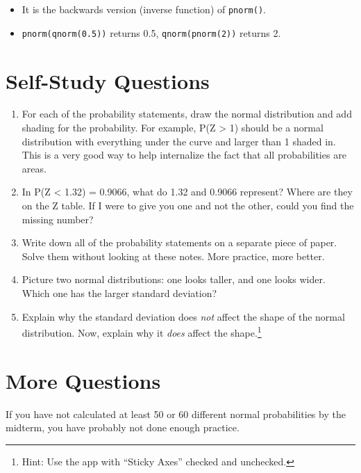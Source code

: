 \documentclass[
  letterpaper,
  DIV=11,
  numbers=noendperiod]{scrreprt}
\providecommand{\tightlist}{%
  \setlength{\itemsep}{0pt}\setlength{\parskip}{0pt}}\usepackage{longtable,booktabs,array}
\begin{document}
\begin{itemize}
\begin{itemize}
    \begin{itemize}
    \tightlist
    \item
      It is the backwards version (inverse function) of
      \texttt{pnorm()}.
    \item
      \texttt{pnorm(qnorm(0.5))} returns 0.5, \texttt{qnorm(pnorm(2))}
      returns 2.
    \end{itemize}
  \end{itemize}
\end{itemize}

\hypertarget{self-study-questions-1}{%
\chapter{Self-Study Questions}\label{self-study-questions-1}}

\begin{enumerate}
\def\labelenumi{\arabic{enumi}.}
\tightlist
\item
  For each of the probability statements, draw the normal distribution
  and add shading for the probability. For example, P(Z \textgreater{}
  1) should be a normal distribution with everything under the curve and
  larger than 1 shaded in. This is a very good way to help internalize
  the fact that all probabilities are areas.
\item
  In P(Z \textless{} 1.32) = 0.9066, what do 1.32 and 0.9066 represent?
  Where are they on the Z table. If I were to give you one and not the
  other, could you find the missing number?
\item
  Write down all of the probability statements on a separate piece of
  paper. Solve them without looking at these notes. More practice, more
  better.
\item
  Picture two normal distributions: one looks taller, and one looks
  wider. Which one has the larger standard deviation?
\item
  Explain why the standard deviation does \emph{not} affect the shape of
  the normal distribution. Now, explain why it \emph{does} affect the
  shape.\footnote{Hint: Use the app with ``Sticky Axes'' checked and
    unchecked.}
\end{enumerate}

\hypertarget{more-questions}{%
\chapter{More Questions}\label{more-questions}}

If you have not calculated at least 50 or 60 different normal
probabilities by the midterm, you have probably not done enough
practice.
\end{document}
